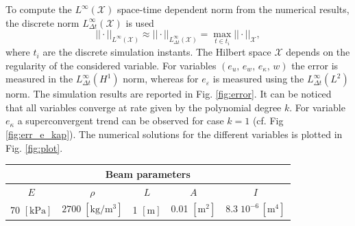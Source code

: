 \documentclass{ifacconf}
\begin{document}
To compute the $L^\infty (\mathcal{X})$ space-time dependent norm from the numerical results, the discrete norm $L^\infty_{\Delta t} (\mathcal{X})$ is used
\[
||\cdot ||_{L^\infty (\mathcal{X})} \approx || \cdot ||_{L^\infty_{\Delta t} (\mathcal{X})} = \max_{t \in t_i} ||\cdot||_{\mathcal{X}},
\]
where $t_i$ are the discrete simulation instants. The Hilbert space $\mathcal{X}$ depends on the regularity of the considered variable. For variables $(e_u,\, e_w,\, e_\kappa,\, w)$ the error is measured in the $L^\infty_{\Delta t}(H^1)$ norm, whereas for $e_\varepsilon$ is measured using the $L^\infty_{\Delta t}(L^2)$ norm. The simulation results are reported in Fig. \ref{fig:error}. It can be noticed that all variables converge at rate given by the polynomial degree $k$. For variable $e_\kappa$ a superconvergent trend can be observed for case $k=1$ (cf. Fig \ref{fig:err_e_kap}). The numerical solutions for the different variables is plotted in Fig. \ref{fig:plot}.


\begin{table}[h]
	\centering
	\begin{tabular}{ccccc}
		\hline 
		\multicolumn{5}{c}{Beam parameters} \\ 
		\hline 
		$E$ & $\rho$ & $L$  & $A$ & $I$ \\
		70 $[\textrm{kPa}]$ & $2700\; [\textrm{kg}/\textrm{m}^3]$ & 1 $[\textrm{m}]$ &  0.01 $[\textrm{m}^2]$ & $8.3 \; 10^{-6} \, [\textrm{m}^4]$\\ 
		\hline 
	\end{tabular} 
	\captionsetup{width=0.95\linewidth}
	\vspace{1mm}
	\label{tab:par}
\end{table}
\end{document}
